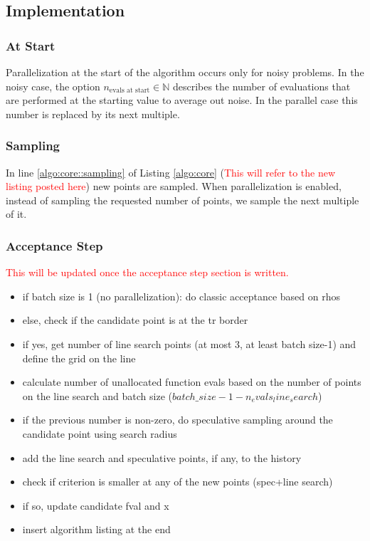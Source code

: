 \subsection{Implementation}\label{subsec:parallelization::implementation}

\subsubsection{At Start}

Parallelization at the start of the algorithm occurs only for noisy problems. In the noisy case, the
option $n_{\text{evals at start}} \in \mathbb{N}$ describes the number of evaluations that are
performed at the starting value to average out noise. In the parallel case this number is replaced
by its next multiple.

\subsubsection{Sampling}

In line \ref{algo:core::sampling} of Listing \ref{algo:core} (\textcolor{red}{This will refer to the
new listing posted here}) new points are sampled. When parallelization is enabled, instead of
sampling the requested number of points, we sample the next multiple of it.

\subsubsection{Acceptance Step}

\textcolor{red}{This will be updated once the acceptance step section is written.}

\begin{itemize}
    \item if batch size is 1 (no parallelization): do classic acceptance based on rhos
    \item else, check if the candidate point is at the tr border
    \item if yes, get number of line search points (at most 3, at least batch size-1) and define the
        grid on the line
    \item calculate number of unallocated function evals based on the number of points on the line
        search and batch size ($batch\_size-1-n_evals_line_search$) 
    \item if the previous number is non-zero, do speculative sampling around the candidate point
        using search radius
    \item add the line search and speculative points, if any, to the history
    \item check if criterion is smaller at any of the new points (spec+line search)
    \item if so, update candidate fval and x
    \item insert algorithm listing at the end
\end{itemize}

